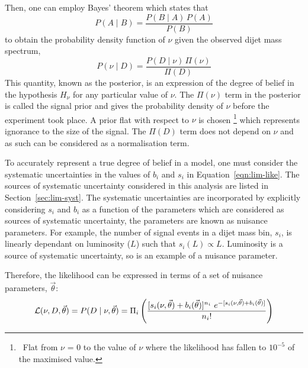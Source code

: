 \noindent
Then, one can employ Bayes' theorem which states that
\begin{equation}
  P(A \mid B) = \frac{P(B \mid A) \, P(A)}{P(B)}
\end{equation}
to obtain the probability density function of $\nu$ given the observed dijet mass spectrum,
\begin{equation}
  P(\nu \mid D) = \frac{ P(D \mid \nu) \, \Pi( \nu ) }{ \Pi( D ) }
  \label{eq:lim-conf_statOnly}
\end{equation}
This quantity, known as the posterior, is an expression of the degree of belief in the hypothesis
$H_{\nu}$ for any particular value of $\nu$.
The $\Pi( \nu )$ term in the posterior %
is called the signal prior
and gives the probability density of $\nu$ before the experiment took place.
A prior flat with respect to $\nu$ is chosen
\footnote{\ Flat from $\nu$ = 0 to the value of $\nu$ where the
likelihood has fallen to $10^{-5}$ of the maximised value.}
which represents ignorance to the size of the signal.
The $\Pi(D)$ term does not depend on $\nu$ and as such can be considered as a normalisation term.

To accurately represent a true degree of belief in a model, one must consider the systematic uncertainties
in the values of $b_i$ and $s_i$ in Equation~\ref{eqn:lim-like}.
The sources of systematic uncertainty considered in this analysis are listed in Section~\ref{sec:lim-syst}.
The systematic uncertainties are incorporated by explicitly considering $s_i$ and $b_i$ as a
function of the parameters which are considered as sources of systematic uncertainty,
the parameters are known as nuisance parameters.
For example, the number of signal events in a dijet mass bin, $s_i$, is linearly dependant on luminosity ($L$) such that $s_i(L) \propto L$.
Luminosity is a source of systematic uncertainty, so is an example of a nuisance parameter.

\noindent
Therefore, the likelihood can be expressed in terms of a set of nuisance parameters, $\vec{\theta}$:
\begin{equation}
  \mathcal{L} (\nu,D,\vec{\theta}) = P(D \mid \nu, \vec{\theta} ) =  \Pi_i \left( \frac{[s_i(\nu,\vec{\theta})+b_i(\vec{\theta})]^{n_i}~e^{-[s_i(\nu,\vec{\theta})+b_i(\vec{\theta})]}}{n_i!} \right)
\end{equation}

